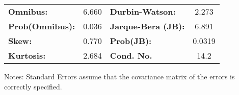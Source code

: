 \begin{center}
\begin{tabular}{lcccccc}
\bottomrule
\end{tabular}
\begin{tabular}{lclc}
\textbf{Omnibus:}       &  6.660 & \textbf{  Durbin-Watson:     } &    2.273  \\
\textbf{Prob(Omnibus):} &  0.036 & \textbf{  Jarque-Bera (JB):  } &    6.891  \\
\textbf{Skew:}          &  0.770 & \textbf{  Prob(JB):          } &   0.0319  \\
\textbf{Kurtosis:}      &  2.684 & \textbf{  Cond. No.          } &     14.2  \\
\bottomrule
\end{tabular}
\end{center}

Notes: \newline
 [1] Standard Errors assume that the covariance matrix of the errors is correctly specified.